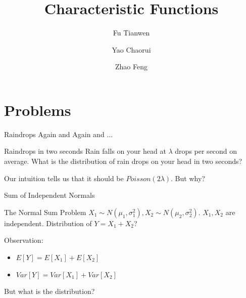 \documentclass{beamer}
\title{Characteristic Functions}
\author[Fu\and Yao\and Zhao]{Fu Tianwen \and Yao Chaorui \and Zhao Feng}
\institute[CUHK]{the Chinese University of Hong Kong}
\begin{document}
\begin{frame}
	\titlepage
\end{frame}
\section{Problems}
\begin{frame}{Raindrops Again and Again and ...}
	\begin{block}{Raindrops in two seconds}
		Rain falls on your head at $\lambda$ drops per second on average. What is the distribution of rain drops on your head in two seconds?\pause
	\end{block}
	Our intuition tells us that it should be $Poisson(2\lambda)$.\pause
	But why?
\end{frame}
\begin{frame}{Sum of Independent Normals}
	\begin{block}{The Normal Sum Problem}
		$X_1\sim N(\mu_1,\sigma_1^2), X_2\sim N(\mu_2,\sigma_2^2).$ $X_1,X_2$ are independent. Distribution of $Y=X_1+X_2$?\pause
	\end{block}
	Observation:
	\begin{itemize}
		\item $E[Y] = E[X_1]+E[X_2]$ 
		\item $Var[Y] = Var[X_1]+Var[X_2]$ \pause
	\end{itemize}
	But what is the distribution?
\end{frame}
\end{document}
